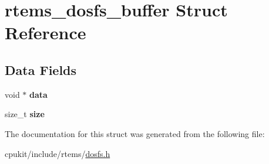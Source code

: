\hypertarget{structrtems__dosfs__buffer}{}\section{rtems\+\_\+dosfs\+\_\+buffer Struct Reference}
\label{structrtems__dosfs__buffer}
\subsection*{Data Fields}
\begin{DoxyCompactItemize}
\item 
\mbox{\label{structrtems__dosfs__buffer_af152dbadd9390fcc0a652149a319063f}} 
void $\ast$ {\bfseries data}
\item 
\mbox{\label{structrtems__dosfs__buffer_a5ba6b62e94d19aa2786c8cba4bde66fd}} 
size\+\_\+t {\bfseries size}
\end{DoxyCompactItemize}


The documentation for this struct was generated from the following file\+:\begin{DoxyCompactItemize}
\item 
cpukit/include/rtems/\mbox{\hyperlink{dosfs_8h}{dosfs.\+h}}\end{DoxyCompactItemize}
